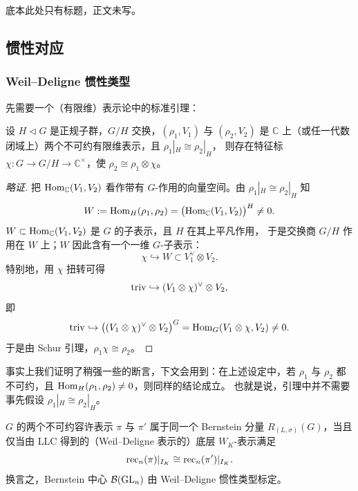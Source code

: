 底本此处只有标题，正文未写。

\subsection{惯性对应}

\subsubsection{Weil--Deligne 惯性类型}

先需要一个（有限维）表示论中的标准引理：

\begin{lemma}
设 $H\triangleleft G$ 是正规子群，$G/H$ 交换，$(\rho_1,V_1)$ 与 $(\rho_2,V_2)$ 是
$\mathbb{C}$ 上（或任一代数闭域上）两个不可约有限维表示，且 $\rho_1|_H\cong\rho_2|_H$，
则存在特征标 $\chi\colon G\to G/H\to\mathbb{C}^{\times}$，使 $\rho_2\cong\rho_1\otimes\chi$。
\end{lemma}

\begin{proof}[略证]
把 $\mathrm{Hom}_{\mathbb{C}}(V_1,V_2)$ 看作带有 $G$-作用的向量空间。由
$\rho_1|_H\cong\rho_2|_H$ 知
\[
W:=\mathrm{Hom}_H(\rho_1,\rho_2)=\bigl(\mathrm{Hom}_{\mathbb{C}}(V_1,V_2)\bigr)^{H}\neq 0 .
\]
$W\subset\mathrm{Hom}_{\mathbb{C}}(V_1,V_2)$ 是 $G$ 的子表示，且 $H$ 在其上平凡作用，
于是交换商 $G/H$ 作用在 $W$ 上；$W$ 因此含有一个一维 $G$-子表示：
\[
\chi\hookrightarrow W\subset V_1^{\vee}\otimes V_2 .
\]
特别地，用 $\chi$ 扭转可得
\[
\mathrm{triv}\hookrightarrow(V_1\otimes\chi)^{\vee}\otimes V_2,
\]
即
\[
\mathrm{triv}\hookrightarrow\bigl((V_1\otimes\chi)^{\vee}\otimes V_2\bigr)^{G}
=\mathrm{Hom}_G(V_1\otimes\chi,V_2)\neq 0 .
\]
于是由 Schur 引理，$\rho_1\chi\cong\rho_2$。
\end{proof}

\begin{remark}
事实上我们证明了稍强一些的断言，下文会用到：在上述设定中，若 $\rho_1$ 与 $\rho_2$
都不可约，且 $\mathrm{Hom}_H(\rho_1,\rho_2)\neq 0$，则同样的结论成立。
也就是说，引理中并不需要事先假设 $\rho_1|_H\cong\rho_2|_H$。
\end{remark}

\begin{lemma}
$G$ 的两个不可约容许表示 $\pi$ 与 $\pi'$ 属于同一个 Bernstein 分量
$R_{(L,\sigma)}(G)$，当且仅当由 LLC 得到的（Weil--Deligne 表示的）底层 $W_K$-表示满足
\[
\mathrm{rec}_n(\pi)|_{I_K}\cong\mathrm{rec}_n(\pi')|_{I_K}.
\]
换言之，Bernstein 中心 $\mathcal{B}(\mathrm{GL}_n)$ 由 Weil--Deligne 惯性类型标定。
\end{lemma}

